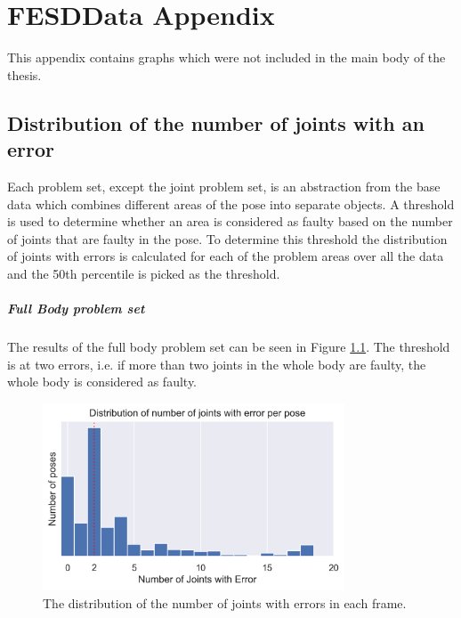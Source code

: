 \chapter{FESDData Appendix}

This appendix contains graphs which were not included in the main body of the thesis.

\section{Distribution of the number of joints with an error}

Each problem set, except the joint problem set, is an abstraction from the base data which combines different areas of the pose into separate objects. A threshold is used to determine whether an area is considered as faulty based on the number of joints that are faulty in the pose. To determine this threshold the distribution of joints with errors is calculated for each of the problem areas over all the data and the 50th percentile is picked as the threshold.

\paragraph{Full Body problem set}

The results of the full body problem set can be seen in Figure \ref{fig:dist_jt_epp}. The threshold is at two errors, i.e. if more than two joints in the whole body are faulty, the whole body is considered as faulty.

\begin{figure}[ht]
  \centering
  \includegraphics[width=0.8\textwidth]{figures/Data/joint_errors_per_pose/distribution_of_joint_errors_per_pose.png}
  \caption[Number of Joints with error]{The distribution of the number of joints with errors in each frame.}
  \label{fig:dist_jt_epp}
\end{figure}

